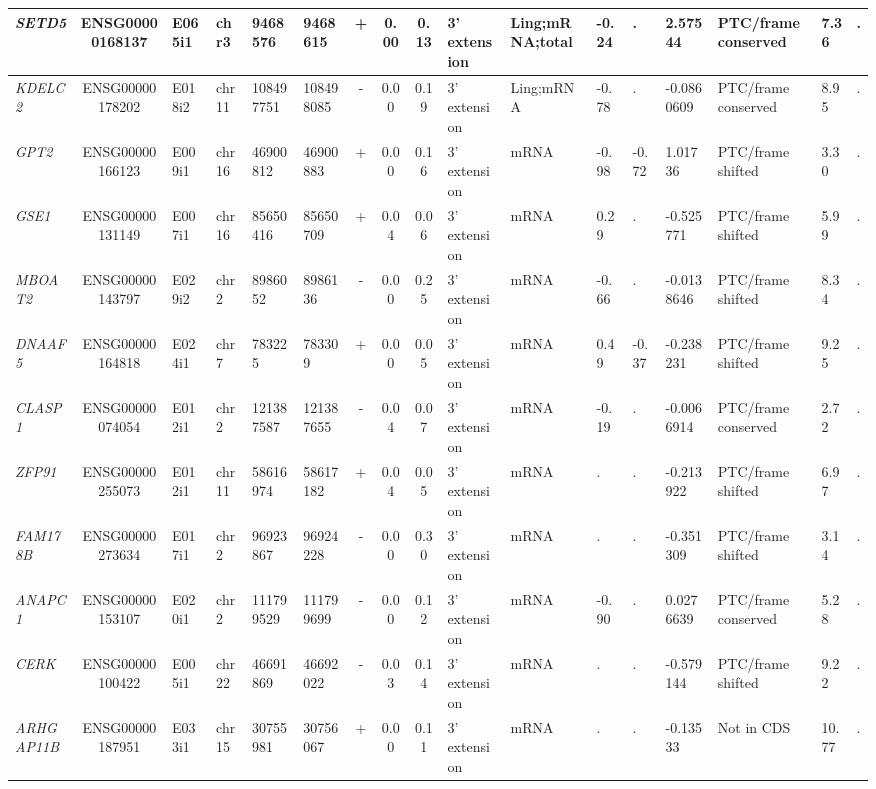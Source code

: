 \begin{appendices}
\begin{landscape}
\begin{table}
{\begin{tabular}{|l|c|l|l|l|l|c|c|c|l|l|l|l|l|l|l|l|}
		\textit{SETD5} & ENSG00000168137 & E065i1 & chr3  & 9468576 & 9468615 & +     & 0.00  & 0.13  & 3' extension & Ling;mRNA;total & -0.24 & . & 2.57544 & PTC/frame conserved & 7.36  & . \\ \hline
		\textit{KDELC2} & ENSG00000178202 & E018i2 & chr11 & 108497751 & 108498085 & -     & 0.00  & 0.19  & 3' extension & Ling;mRNA & -0.78 & . & -0.0860609 & PTC/frame conserved & 8.95  & . \\ \hline
		\textit{GPT2} & ENSG00000166123 & E009i1 & chr16 & 46900812 & 46900883 & +     & 0.00  & 0.16  & 3' extension & mRNA  & -0.98 & -0.72 & 1.01736 & PTC/frame shifted & 3.30  & . \\ \hline
		\textit{GSE1} & ENSG00000131149 & E007i1 & chr16 & 85650416 & 85650709 & +     & 0.04  & 0.06  & 3' extension & mRNA  & 0.29  & . & -0.525771 & PTC/frame shifted & 5.99  & . \\ \hline
		\textit{MBOAT2} & ENSG00000143797 & E029i2 & chr2  & 8986052 & 8986136 & -     & 0.00  & 0.25  & 3' extension & mRNA  & -0.66 & . & -0.0138646 & PTC/frame shifted & 8.34  & . \\ \hline
		\textit{DNAAF5} & ENSG00000164818 & E024i1 & chr7  & 783225 & 783309 & +     & 0.00  & 0.05  & 3' extension & mRNA  & 0.49  & -0.37 & -0.238231 & PTC/frame shifted & 9.25  & . \\ \hline
		\textit{CLASP1} & ENSG00000074054 & E012i1 & chr2  & 121387587 & 121387655 & -     & 0.04  & 0.07  & 3' extension & mRNA  & -0.19 & . & -0.0066914 & PTC/frame conserved & 2.72  & . \\ \hline
		\textit{ZFP91} & ENSG00000255073 & E012i1 & chr11 & 58616974 & 58617182 & +     & 0.04  & 0.05  & 3' extension & mRNA  & . & . & -0.213922 & PTC/frame shifted & 6.97  & . \\ \hline
		\textit{FAM178B} & ENSG00000273634 & E017i1 & chr2  & 96923867 & 96924228 & -     & 0.00  & 0.30  & 3' extension & mRNA  & . & . & -0.351309 & PTC/frame shifted & 3.14  & . \\  \hline
		\textit{ANAPC1} & ENSG00000153107 & E020i1 & chr2  & 111799529 & 111799699 & -     & 0.00  & 0.12  & 3' extension & mRNA  & -0.90 & . & 0.0276639 & PTC/frame conserved & 5.28  & . \\ \hline
		\textit{CERK} & ENSG00000100422 & E005i1 & chr22 & 46691869 & 46692022 & -     & 0.03  & 0.14  & 3' extension & mRNA  & . & . & -0.579144 & PTC/frame shifted & 9.22  & . \\ \hline
		\textit{ARHGAP11B} & ENSG00000187951 & E033i1 & chr15 & 30755981 & 30756067 & +     & 0.00  & 0.11  & 3' extension & mRNA  & . & . & -0.13533 & Not in CDS     & 10.77 & . \\ \hline

\end{tabular}}
\end{table}
\end{landscape}
\end{appendices}
